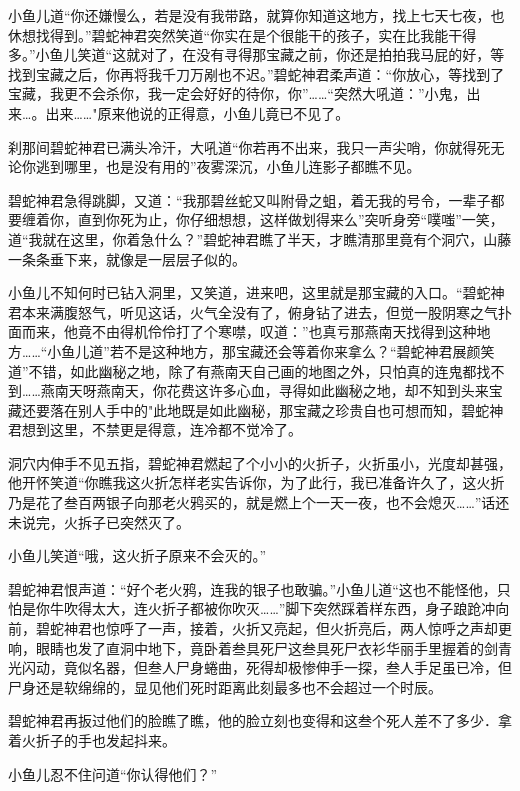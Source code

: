 \documentclass[12pt,oneside]{book}
\begin{document}
小鱼儿道``你还嫌慢么，若是没有我带路，就算你知道这地方，找上七天七夜，也休想找得到。''碧蛇神君突然笑道``你实在是个很能干的孩子，实在比我能干得多。''小鱼儿笑道``这就对了，在没有寻得那宝藏之前，你还是拍拍我马屁的好，等找到宝藏之后，你再将我千刀万剐也不迟。''碧蛇神君柔声道：``你放心，等找到了宝藏，我更不会杀你，我一定会好好的待你，你''\ldots\ldots{}``突然大吼道：''小鬼，出来\ldots。出来\ldots\ldots"原来他说的正得意，小鱼儿竟已不见了。

刹那间碧蛇神君已满头冷汗，大吼道``你若再不出来，我只一声尖哨，你就得死无论你逃到哪里，也是没有用的''夜雾深沉，小鱼儿连影子都瞧不见。

碧蛇神君急得跳脚，又道：``我那碧丝蛇又叫附骨之蛆，着无我的号令，一辈子都要缠着你，直到你死为止，你仔细想想，这样做划得来么''突听身旁``噗嗤''一笑，道``我就在这里，你着急什么？''碧蛇神君瞧了半天，才瞧清那里竟有个洞穴，山藤一条条垂下来，就像是一层层子似的。

小鱼儿不知何时已钻入洞里，又笑道，进来吧，这里就是那宝藏的入口。``碧蛇神君本来满腹怒气，听见这话，火气全没有了，俯身钻了进去，但觉一股阴寒之气扑面而来，他竟不由得机伶伶打了个寒噤，叹道：''也真亏那燕南天找得到这种地方\ldots\ldots{}``小鱼儿道''若不是这种地方，那宝藏还会等着你来拿么？``碧蛇神君展颜笑道''不错，如此幽秘之地，除了有燕南天自己画的地图之外，只怕真的连鬼都找不到\ldots\ldots 燕南天呀燕南天，你花费这许多心血，寻得如此幽秘之地，却不知到头来宝藏还要落在别人手中的"此地既是如此幽秘，那宝藏之珍贵自也可想而知，碧蛇神君想到这里，不禁更是得意，连冷都不觉冷了。

洞穴内伸手不见五指，碧蛇神君燃起了个小小的火折子，火折虽小，光度却甚强，他开怀笑道``你瞧我这火折怎样老实告诉你，为了此行，我已准备许久了，这火折乃是花了叁百两银子向那老火鸦买的，就是燃上个一天一夜，也不会熄灭\ldots\ldots{}''话还未说完，火拆子已突然灭了。

小鱼儿笑道``哦，这火折子原来不会灭的。''

碧蛇神君恨声道：``好个老火鸦，连我的银子也敢骗。''小鱼儿道``这也不能怪他，只怕是你牛吹得太大，连火折子都被你吹灭\ldots\ldots{}''脚下突然踩着样东西，身子踉跄冲向前，碧蛇神君也惊呼了一声，接着，火折又亮起，但火折亮后，两人惊呼之声却更响，眼睛也发了直洞中地下，竟卧着叁具死尸这叁具死尸衣衫华丽手里握着的剑青光闪动，竟似名器，但叁人尸身蜷曲，死得却极惨伸手一探，叁人手足虽已冷，但尸身还是软绵绵的，显见他们死时距离此刻最多也不会超过一个时辰。

碧蛇神君再扳过他们的脸瞧了瞧，他的脸立刻也变得和这叁个死人差不了多少．拿着火折子的手也发起抖来。

小鱼儿忍不住问道``你认得他们？''
\end{document}
